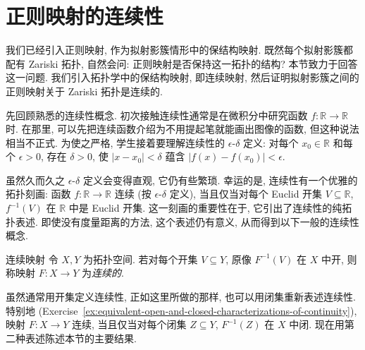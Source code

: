 \section{正则映射的连续性}\label{sec:continuity-of-regular-maps}

我们已经引入正则映射, 作为拟射影簇情形中的\textquotedbl{}保结构\textquotedbl{}映射. 既然每个拟射影簇都配有 Zariski 拓扑, 自然会问: 正则映射是否保持这一拓扑的\textquotedbl{}结构\textquotedbl{}? 本节致力于回答这一问题. 我们引入拓扑学中的保结构映射, 即连续映射, 然后证明拟射影簇之间的正则映射关于 Zariski 拓扑是连续的.

先回顾熟悉的连续性概念. 初次接触连续性通常是在微积分中研究函数 $f:\mathbb{R}\to\mathbb{R}$ 时. 在那里, 可以先把连续函数介绍为不用提起笔就能画出图像的函数, 但这种说法相当不正式. 为使之严格, 学生接着要理解连续性的 $\epsilon$-$\delta$ 定义: 对每个 $x_{0}\in\mathbb{R}$ 和每个 $\epsilon>0$, 存在 $\delta>0$, 使 $|x-x_{0}|<\delta$ 蕴含 $|f(x)-f(x_{0})|<\epsilon$.

虽然久而久之 $\epsilon$-$\delta$ 定义会变得直观, 它仍有些繁琐. 幸运的是, 连续性有一个优雅的拓扑刻画: 函数 $f:\mathbb{R}\to\mathbb{R}$ 连续 (按 $\epsilon$-$\delta$ 定义), 当且仅当对每个 Euclid 开集 $V\subseteq\mathbb{R}$, $f^{-1}(V)$ 在 $\mathbb{R}$ 中是 Euclid 开集. 这一刻画的重要性在于, 它引出了连续性的纯拓扑表述. 即使没有度量距离的方法, 这个表述仍有意义, 从而得到以下一般的连续性概念.

\begin{Definition}{连续映射}\leavevmode\label{def:continuous-map-of-topological-spaces}
令 $X,Y$ 为拓扑空间. 若对每个开集 $V\subseteq Y$, 原像 $F^{-1}(V)$ 在 $X$ 中开, 则称映射 $F:X\to Y$ 为\emph{连续的}.
\end{Definition}

虽然通常用开集定义连续性, 正如这里所做的那样, 也可以用闭集重新表述连续性. 特别地 (Exercise~\ref{ex:equivalent-open-and-closed-characterizations-of-continuity}), 映射 $F:X\to Y$ 连续, 当且仅当对每个闭集 $Z\subseteq Y$, $F^{-1}(Z)$ 在 $X$ 中闭. 现在用第二种表述陈述本节的主要结果.

